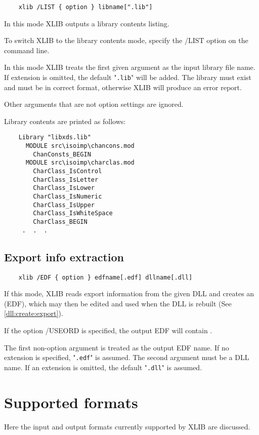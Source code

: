 \verb'    xlib /LIST { option } libname[".lib"]'

In this mode XLIB outputs a library contents listing.

To switch XLIB to the library contents mode, specify the /LIST option
on the command line.

In this mode XLIB treats the first given argument as the input library
file name. If extension is omitted, the default "\verb'.lib'" will be
added. The library must exist and must be in correct format,
otherwise XLIB will produce an error report.

Other arguments that are not option settings are ignored.

Library contents are printed as follows:

\begin{verbatim}
    Library "libxds.lib"
      MODULE src\isoimp\chancons.mod
        ChanConsts_BEGIN
      MODULE src\isoimp\charclas.mod
        CharClass_IsControl
        CharClass_IsLetter
        CharClass_IsLower
        CharClass_IsNumeric
        CharClass_IsUpper
        CharClass_IsWhiteSpace
        CharClass_BEGIN
     .  .  .
\end{verbatim}

\subsection{Export info extraction}
\label{xlib:modes:export}

\verb'    xlib /EDF { option } edfname[.edf] dllname[.dll]'

If this mode, XLIB reads export information from the given DLL and
creates an  (EDF),
which may then be edited and used when the DLL is rebuilt
(See \ref{dll:create:export}).

If the option /USEORD is specified, the output EDF will contain
.

The first non-option argument is treated as the output EDF name.
If no extension is specified, "\verb'.edf'" is assumed.
The second argument must be a DLL name.
If an extension is omitted, the default "\verb'.dll'" is assumed.

\section{Supported formats}
\label{xlib:formats}

Here the input and output formats currently supported by XLIB are
discussed.

